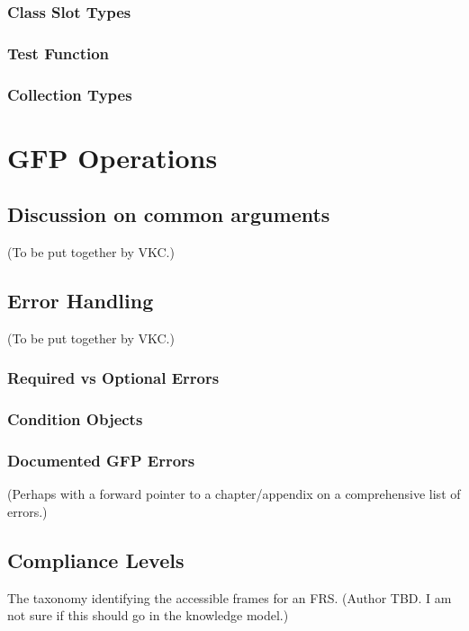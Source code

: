 \subsection{Class Slot Types}

\subsection{Test Function}

\subsection{Collection Types}

\chapter{GFP Operations}

\section{Discussion on common arguments}
(To be put together by VKC.)

\section{Error Handling}
(To be put together by VKC.)

\subsection{Required vs Optional Errors}

\subsection{Condition Objects}

\subsection{Documented GFP Errors}
(Perhaps with a forward pointer to a chapter/appendix on 
a comprehensive list of errors.)

\section{Compliance Levels}
The taxonomy identifying the accessible frames for an FRS.  (Author
TBD.  I am not sure if this should go in the knowledge model.)

